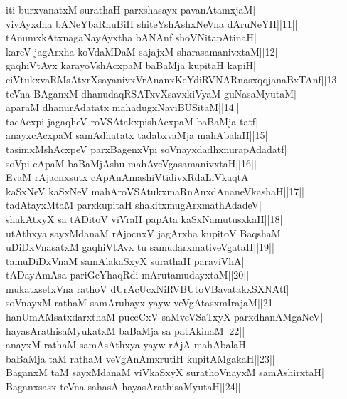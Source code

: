 \documentclass{article}
\begin{document}
iti  burxvanatxM surathaH parxshasayx pavanAtamxjaM|\\
vivAyxdha bANeYbaRhuBiH shiteYshAshxNeVna dAruNeYH||11||\\
tAnumxkAtxnagaNayAyxtha bANAnf shoVNitapAtinaH|\\
kareV jagArxha koVdaMDaM sajajxM sharasamanivxtaM||12||\\
gaqhiVtAvx karayoVshAcxpaM baBaMja kupitaH kapiH|\\
ciVtukxvaRMsAtxrXsayanivxVrAnanxKeYdiRVNARnasxqqjanaBxTAnf||13||\\
teVna BAganxM dhanudaqRSATxvXsavxkiVyaM guNasaMyutaM|\\
aparaM dhanurAdatatx mahadugxNaviBUSitaM||14||\\
tacAcxpi jagaqheV roVSAtakxpishAcxpaM baBaMja tatf|\\
anayxcAcxpaM samAdhatatx tadabxvaMja mahAbalaH||15||\\
tasimxMshAcxpeV parxBagenxVpi soVnayxdadhxnurapAdadatf|\\
soVpi cApaM baBaMjAshu mahAveVgasamanivxtaH||16||\\
EvaM rAjacnxsutx cApAnAmashiVtidivxRdaLiVkaqtA|\\
kaSxNeV kaSxNeV mahAroVSAtukxmaRnAnxdAnaneVkashaH||17||\\
tadAtayxMtaM parxkupitaH shakitxmugArxmathAdadeV|\\
shakAtxyX sa tADitoV viVraH papAta kaSxNamutusxkaH||18||\\
utAthxya sayxMdanaM rAjocnxV jagArxha kupitoV BaqshaM|\\
uDiDxVnasatxM gaqhiVtAvx tu samudarxmativeVgataH||19||\\
tamuDiDxVnaM samAlakaSxyX surathaH paraviVhA|\\
tADayAmAsa pariGeYhaqRdi mArutamudayxtaM||20||\\
mukatxsetxVna rathoV dUrAcUcxNiRVBUtoVBavatakxSXNAtf|\\
soVnayxM rathaM samAruhayx yayw veVgAtasxmIrajaM||21||\\
hanUmAMsatxdarxthaM puceCxV saMveVSaTxyX parxdhanAMgaNeV|\\
hayasArathisaMyukatxM baBaMja sa patAkinaM||22||\\
anayxM rathaM samAsAthxya yayw rAjA mahAbalaH|\\
baBaMja taM rathaM veVgAnAmxrutiH kupitAMgakaH||23||\\
BaganxM taM sayxMdanaM viVkaSxyX surathoVnayxM samAshirxtaH|\\
Baganxsasx teVna sahasA hayasArathisaMyutaH||24||\\
\end{document}
